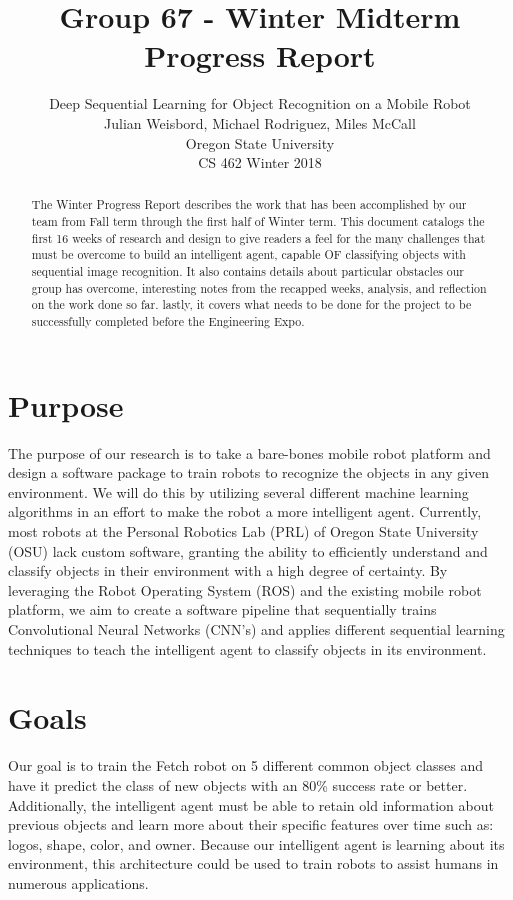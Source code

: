 \documentclass[draftclsnofoot, onecolumn, 10pt, compsoc]{IEEEtran}
\title{Group 67 - Winter Midterm Progress Report}
\author{
            Deep Sequential Learning for Object Recognition on a Mobile Robot \\
            Julian Weisbord, Michael Rodriguez, Miles McCall \\
            Oregon State University \\
            CS 462 Winter 2018
		}
\begin{document}
\maketitle

\begin{abstract}
The Winter Progress Report describes the work that has been accomplished by our team from Fall term through the first half of Winter term. This document catalogs the first 16 weeks of research and design to give readers a feel for the many challenges that must be overcome to build an intelligent agent, capable OF classifying objects with sequential image recognition. It also contains details about particular obstacles our group has overcome, interesting notes from the recapped weeks, analysis, and reflection on the work done so far. lastly, it covers what needs to be done for the project to be successfully completed before the Engineering Expo.
\end{abstract}
\newpage

\tableofcontents
\newpage

\section{Purpose}
The purpose of our research is to take a bare-bones mobile robot platform and design a software package to train robots to recognize the objects in any given environment. We will do this by utilizing several different machine learning algorithms in an effort to make the robot a more intelligent agent. Currently, most robots at the Personal Robotics Lab (PRL) of Oregon State University (OSU) lack custom software, granting the ability to efficiently understand and classify objects in their environment with a high degree of certainty. By leveraging the Robot Operating System (ROS) and the existing mobile robot platform, we aim to create a software pipeline that sequentially trains Convolutional Neural Networks (CNN's) and applies different sequential learning techniques to teach the intelligent agent to classify objects in its environment. 

\section{Goals}
Our goal is to train the Fetch robot on 5 different common object classes and have it predict the class of new objects with an 80\% success rate or better. Additionally, the intelligent agent must be able to retain old information about previous objects and learn more about their specific features over time such as: logos, shape, color, and owner. Because our intelligent agent is learning about its environment, this architecture could be used to train robots to assist humans in numerous applications.
\end{document}
